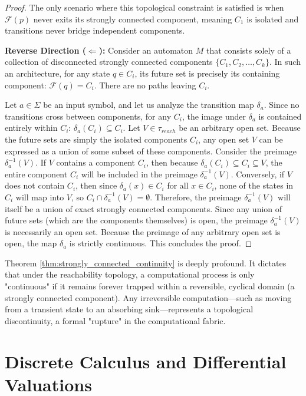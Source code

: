 \begin{proof}
The only scenario where this topological constraint is satisfied is when $\mathcal{F}(p)$ never exits its strongly connected component, meaning $C_1$ is isolated and transitions never bridge independent components. 

\textbf{Reverse Direction ($\Leftarrow$):}
Consider an automaton $M$ that consists solely of a collection of disconnected strongly connected components $\{C_1, C_2, \ldots, C_k\}$. In such an architecture, for any state $q \in C_i$, its future set is precisely its containing component: $\mathcal{F}(q) = C_i$. There are no paths leaving $C_i$.

Let $a \in \Sigma$ be an input symbol, and let us analyze the transition map $\delta_a$. Since no transitions cross between components, for any $C_i$, the image under $\delta_a$ is contained entirely within $C_i$: $\delta_a(C_i) \subseteq C_i$. 
Let $V \in \tau_{reach}$ be an arbitrary open set. Because the future sets are simply the isolated components $C_i$, any open set $V$ can be expressed as a union of some subset of these components. 
Consider the preimage $\delta_a^{-1}(V)$. If $V$ contains a component $C_i$, then because $\delta_a(C_i) \subseteq C_i \subseteq V$, the entire component $C_i$ will be included in the preimage $\delta_a^{-1}(V)$. Conversely, if $V$ does not contain $C_i$, then since $\delta_a(x) \in C_i$ for all $x \in C_i$, none of the states in $C_i$ will map into $V$, so $C_i \cap \delta_a^{-1}(V) = \emptyset$.
Therefore, the preimage $\delta_a^{-1}(V)$ will itself be a union of exact strongly connected components. Since any union of future sets (which are the components themselves) is open, the preimage $\delta_a^{-1}(V)$ is necessarily an open set. 
Because the preimage of any arbitrary open set is open, the map $\delta_a$ is strictly continuous. This concludes the proof.
\end{proof}

Theorem \ref{thm:strongly_connected_continuity} is deeply profound. It dictates that under the reachability topology, a computational process is only "continuous" if it remains forever trapped within a reversible, cyclical domain (a strongly connected component). Any irreversible computation—such as moving from a transient state to an absorbing sink—represents a topological discontinuity, a formal "rupture" in the computational fabric. 

\section{Discrete Calculus and Differential Valuations}

